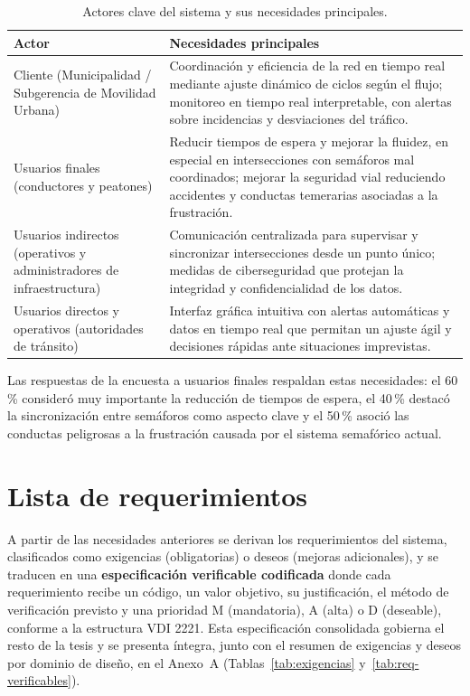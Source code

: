 \begin{table}[H]
  \centering
  \footnotesize
  \caption{Actores clave del sistema y sus necesidades principales.}
  \label{tab:actores}
  \begin{tabularx}{\linewidth}{@{}>{\raggedright\arraybackslash}p{4.3cm}>{\raggedright\arraybackslash}X@{}}
    \toprule
    \textbf{Actor} & \textbf{Necesidades principales}\\
    \midrule
    Cliente (Municipalidad / Subgerencia de Movilidad Urbana) &
    Coordinación y eficiencia de la red en tiempo real mediante ajuste dinámico de ciclos según el flujo;
    monitoreo en tiempo real interpretable, con alertas sobre incidencias y desviaciones del tráfico.\\
    Usuarios finales (conductores y peatones) &
    Reducir tiempos de espera y mejorar la fluidez, en especial en intersecciones con semáforos mal
    coordinados; mejorar la seguridad vial reduciendo accidentes y conductas temerarias asociadas a la
    frustración.\\
    Usuarios indirectos (operativos y administradores de infraestructura) &
    Comunicación centralizada para supervisar y sincronizar intersecciones desde un punto único; medidas de
    ciberseguridad que protejan la integridad y confidencialidad de los datos.\\
    Usuarios directos y operativos (autoridades de tránsito) &
    Interfaz gráfica intuitiva con alertas automáticas y datos en tiempo real que permitan un ajuste ágil y
    decisiones rápidas ante situaciones imprevistas.\\
    \bottomrule
  \end{tabularx}
\end{table}

Las respuestas de la encuesta a usuarios finales respaldan estas necesidades: el 60\,\% consideró muy
importante la reducción de tiempos de espera, el 40\,\% destacó la sincronización entre semáforos como aspecto
clave y el 50\,\% asoció las conductas peligrosas a la frustración causada por el sistema semafórico actual.

\section{Lista de requerimientos}\label{sec:requerimientos}

A partir de las necesidades anteriores se derivan los requerimientos del sistema, clasificados como exigencias
(obligatorias) o deseos (mejoras adicionales), y se traducen en una \textbf{especificación verificable
codificada} donde cada requerimiento recibe un código, un valor objetivo, su justificación, el método de
verificación previsto y una prioridad M (mandatoria), A (alta) o D (deseable), conforme a la estructura VDI
2221. Esta especificación consolidada gobierna el resto de la tesis y se presenta íntegra, junto con el
resumen de exigencias y deseos por dominio de diseño, en el Anexo~A (Tablas~\ref{tab:exigencias}
y~\ref{tab:req-verificables}).

